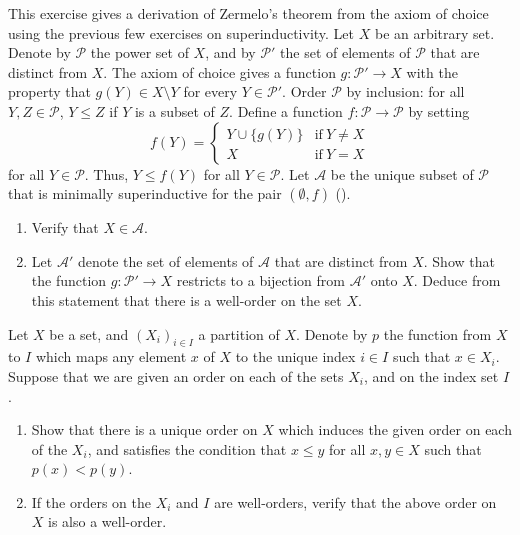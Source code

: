 \documentclass{article}
\begin{document}
\begin{exercise}
  \label{exe:m0vdltb2}
  This exercise gives a derivation of Zermelo's theorem from the axiom
  of choice using the previous few exercises on superinductivity.  Let
  \(X\) be an arbitrary set.  Denote by \(\mathcal{P}\) the power set
  of \(X\), and by \(\mathcal{P}'\) the set of elements of
  \(\mathcal{P}\) that are distinct from \(X\).  The axiom of choice
  gives a function \(g : \mathcal{P}' \to X\) with the property that
  \(g(Y) \in X \setminus Y\) for every \(Y \in \mathcal{P}'\).  Order
  \(\mathcal{P}\) by inclusion: for all \(Y, Z \in \mathcal{P}\),
  \(Y \leq Z\) if \(Y\) is a subset of \(Z\).  Define a function
  \(f : \mathcal{P} \to \mathcal{P}\) by setting
  \begin{displaymath}
    f(Y) =
    \begin{cases}
      Y \cup \{ g(Y) \} & \text{if} ~ Y \neq X \\
      X & \text{if} ~ Y = X
    \end{cases}
  \end{displaymath}
  for all \(Y \in \mathcal{P}\).  Thus, \(Y \leq f(Y)\) for all
  \(Y \in \mathcal{P}\).  Let \(\mathcal{A}\) be the unique subset of
  \(\mathcal{P}\) that is minimally superinductive for the pair
  \((\emptyset, f)\) ().
  \begin{enumerate}
  \item Verify that \(X \in \mathcal{A}\).
  \item Let \(\mathcal{A}'\) denote the set of elements of
    \(\mathcal{A}\) that are distinct from \(X\).  Show that the
    function \(g : \mathcal{P}' \to X\) restricts to a bijection from
    \(\mathcal{A}'\) onto \(X\).  Deduce from this statement that
    there is a well-order on the set \(X\).
  \end{enumerate}
\end{exercise}

\begin{exercise}
  \label{exe:rw9lhmv9}
  Let \(X\) be a set, and \((X_i)_{i \in I}\) a partition of \(X\).
  Denote by \(p\) the function from \(X\) to \(I\) which maps any
  element \(x\) of \(X\) to the unique index \(i \in I\) such that
  \(x \in X_i\).  Suppose that we are given an order on each of the
  sets \(X_i\), and on the index set \(I\).
  \begin{enumerate}
  \item Show that there is a unique order on \(X\) which induces the
    given order on each of the \(X_i\), and satisfies the condition
    that \(x \leq y\) for all \(x, y \in X\) such that
    \(p(x) < p(y)\).
  \item If the orders on the \(X_i\) and \(I\) are well-orders, verify
    that the above order on \(X\) is also a well-order.
  \end{enumerate}
\end{exercise}
\end{document}
